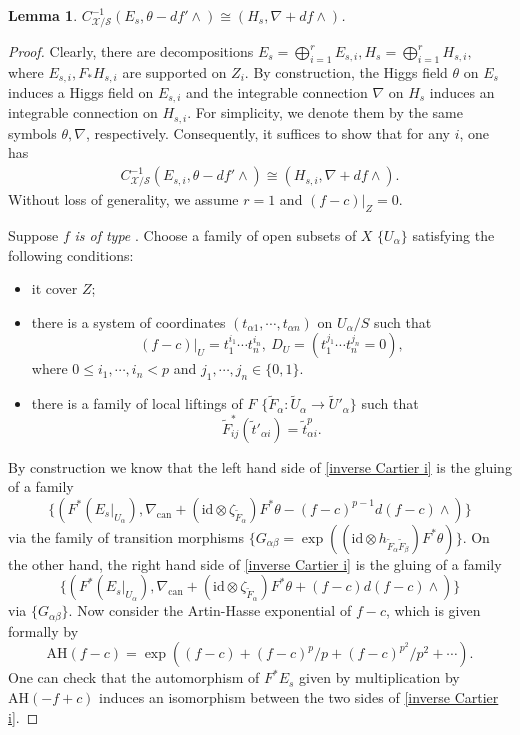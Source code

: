 \documentclass[12pt, a4paper]{article}
\newtheorem{lemma}{Lemma}[section]
\begin{document}
\begin{lemma}
$C^{-1}_{\mathcal X/\mathcal S}(E_s,\theta-df'\wedge)\cong (H_s,\nabla+df\wedge)$.
\end{lemma}
\begin{proof}
 Clearly, there are decompositions
$
E_s=\bigoplus_{i=1}^r E_{s,i},H_s=\bigoplus_{i=1}^r H_{s,i},
$
where $E_{s,i},F_*H_{s,i}$ are supported on $Z_i$. By construction, the Higgs field $\theta$ on $E_s$ induces a Higgs field on $E_{s,i}$ and the integrable connection $\nabla$ on $H_s$ induces an integrable connection on $H_{s,i}$. For simplicity, we denote them by the same symbols $\theta,\nabla$, respectively.
Consequently, it suffices to show that for any $i$, one has
\begin{eqnarray}\label{inverse Cartier i}
C^{-1}_{\mathcal X/\mathcal S}(E_{s,i},\theta-df'\wedge)\cong (H_{s,i},\nabla+df\wedge).
\end{eqnarray}
Without loss of generality, we assume $r=1$ and $(f-c)|_Z=0$.

Suppose $f$ {\itshape is of type \uppercase\expandafter{}}. Choose a family of open subsets of $X$ $\{U_\alpha\}$ satisfying the following conditions:
\begin{itemize}
\item it cover $Z$;
\item there is a system of coordinates $(t_{\alpha1},\cdots,t_{\alpha n})$ on $U_\alpha/S$ such that 
$$
(f-c)|_U=t^{i_1}_1\cdots t_n^{i_n},~D_U=(t^{j_1}_1\cdots t^{j_n}_n=0),$$
where $0\leq i_1,\cdots,i_n<p$ and $j_1,\cdots,j_n\in\{0,1\}$.
\item there is a family of local liftings of $F$ $\{\tilde F_\alpha:\tilde U_\alpha\to\tilde U'_\alpha\}$ such that
$$
\tilde F^*_{ij}(\tilde t'_{\alpha i})=\tilde t^p_{\alpha i}.
$$
\end{itemize}
By construction we know that the left hand side of \eqref{inverse Cartier i} is the gluing of a family
$$
\{(F^*(E_s|_{U_\alpha}),\nabla_{\mathrm{can}}+(\mathrm{id}\otimes\zeta_{\tilde F_\alpha})F^*\theta-(f-c)^{p-1}d(f-c)\wedge)\}
$$
via the family of transition morphisms $\{G_{\alpha\beta}=\exp((\mathrm{id}\otimes h_{\tilde F_\alpha\tilde F_\beta})F^*\theta)\}$. On the other hand,  the right hand side of \eqref{inverse Cartier i} is the gluing of a family
$$
\{(F^*(E_s|_{U_\alpha}),\nabla_{\mathrm{can}}+(\mathrm{id}\otimes\zeta_{\tilde F_\alpha})F^*\theta+(f-c)d(f-c)\wedge)\}
$$
via $\{G_{\alpha\beta}\}$. Now consider the Artin-Hasse exponential of $f-c$, which is given formally by
$$
\mathrm{AH}(f-c)=\exp((f-c)+(f-c)^p/p+(f-c)^{p^2}/p^2+\cdots).
$$
One can check that the automorphism of $F^*E_s$ given by multiplication by $\mathrm{AH}(-f+c)$ induces an isomorphism between the two sides of \eqref{inverse Cartier i}. 


\end{proof}
\end{document}

